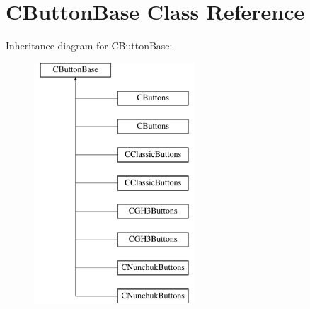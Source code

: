 \hypertarget{class_c_button_base}{\section{C\-Button\-Base Class Reference}
\label{class_c_button_base}
}
Inheritance diagram for C\-Button\-Base\-:\begin{figure}[H]
\begin{center}
\leavevmode
\includegraphics[height=9.000000cm]{class_c_button_base}
\end{center}
\end{figure}
